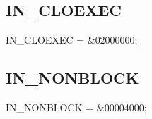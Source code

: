 \documentclass{report}
\newif\ifpdf
\begin{document}
\subsection*{IN{\_}CLOEXEC}
\fi
\label{ok_octal_notation-IN_CLOEXEC}
\begin{list}{}{
\setlength{\itemindent}{0cm}
\setlength{\listparindent}{0cm}
\setlength{\leftmargin}{\evensidemargin}
\addtolength{\leftmargin}{\tmplength}
\settowidth{\labelsep}{X}
\addtolength{\leftmargin}{\labelsep}
\setlength{\labelwidth}{\tmplength}
}
\item[\textbf{Declaration}\hfill]
\ifpdf
\begin{flushleft}
\fi
\begin{ttfamily}
IN{\_}CLOEXEC  = {\&}02000000;\end{ttfamily}

\ifpdf
\end{flushleft}
\fi

\end{list}
\ifpdf
\subsection*{\large{\textbf{IN{\_}NONBLOCK}}\normalsize\hspace{1ex}\hrulefill}
\else
\subsection*{IN{\_}NONBLOCK}
\fi
\label{ok_octal_notation-IN_NONBLOCK}
\begin{list}{}{
\setlength{\itemindent}{0cm}
\setlength{\listparindent}{0cm}
\setlength{\leftmargin}{\evensidemargin}
\addtolength{\leftmargin}{\tmplength}
\settowidth{\labelsep}{X}
\addtolength{\leftmargin}{\labelsep}
\setlength{\labelwidth}{\tmplength}
}
\item[\textbf{Declaration}\hfill]
\ifpdf
\begin{flushleft}
\fi
\begin{ttfamily}
IN{\_}NONBLOCK = {\&}00004000;\end{ttfamily}

\ifpdf
\end{flushleft}
\fi

\end{list}
\end{document}
